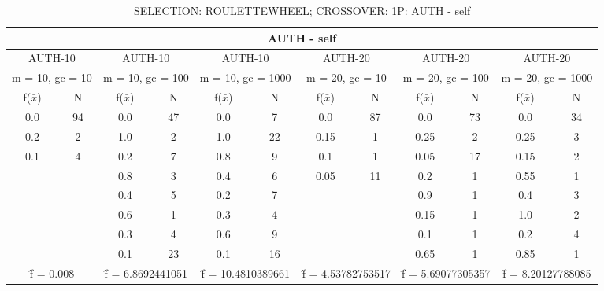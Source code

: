 \begin{table}[H]
	\centering
	\caption{SELECTION: ROULETTEWHEEL; CROSSOVER: 1P: AUTH - self}
	\begin{adjustbox}{width=1\textwidth}
		\begin{tabular}{ |c|c||c|c||c|c||c|c||c|c||c|c| }
			\hline
			\multicolumn{12}{|c|}{AUTH - self} \\
			\hline
			\multicolumn{2}{|c||}{AUTH-10} & \multicolumn{2}{c||}{AUTH-10} & \multicolumn{2}{c||}{AUTH-10} & \multicolumn{2}{c||}{AUTH-20} & \multicolumn{2}{c||}{AUTH-20} & \multicolumn{2}{c|}{AUTH-20}\\
			\hline
			\multicolumn{2}{|c||}{m = 10, gc = 10} & \multicolumn{2}{c||}{m = 10, gc = 100} & \multicolumn{2}{c||}{m = 10, gc = 1000} & \multicolumn{2}{c||}{m = 20, gc = 10} & \multicolumn{2}{c||}{m = 20, gc = 100} & \multicolumn{2}{c|}{m = 20, gc = 1000}\\
			\hline
			f($\bar{x}$) & N & f($\bar{x}$) & N & f($\bar{x}$) & N & f($\bar{x}$) & N & f($\bar{x}$) & N & f($\bar{x}$) & N\\
			\hline
			\hline
			0.0 & 94 & 0.0 & 47 & 0.0 & 7 & 0.0 & 87 & 0.0 & 73 & 0.0 & 34\\
			0.2 & 2 & 1.0 & 2 & 1.0 & 22 & 0.15 & 1 & 0.25 & 2 & 0.25 & 3\\
			0.1 & 4 & 0.2 & 7 & 0.8 & 9 & 0.1 & 1 & 0.05 & 17 & 0.15 & 2\\
			&   & 0.8 & 3 & 0.4 & 6 & 0.05 & 11 & 0.2 & 1 & 0.55 & 1\\
			&   & 0.4 & 5 & 0.2 & 7 &   &   & 0.9 & 1 & 0.4 & 3\\
			&   & 0.6 & 1 & 0.3 & 4 &   &   & 0.15 & 1 & 1.0 & 2\\
			&   & 0.3 & 4 & 0.6 & 9 &   &   & 0.1 & 1 & 0.2 & 4\\
			&   & 0.1 & 23 & 0.1 & 16 &   &   & 0.65 & 1 & 0.85 & 1\\
			\hline
			\multicolumn{2}{|c||}{\^{f} = 0.008} & \multicolumn{2}{c||}{\^{f} = 6.8692441051} & \multicolumn{2}{c||}{\^{f} = 10.4810389661} & \multicolumn{2}{c||}{\^{f} = 4.53782753517} & \multicolumn{2}{c||}{\^{f} = 5.69077305357} & \multicolumn{2}{c|}{\^{f} = 8.20127788085}\\
			\hline
		\end{tabular}
	\end{adjustbox}
\end{table}
